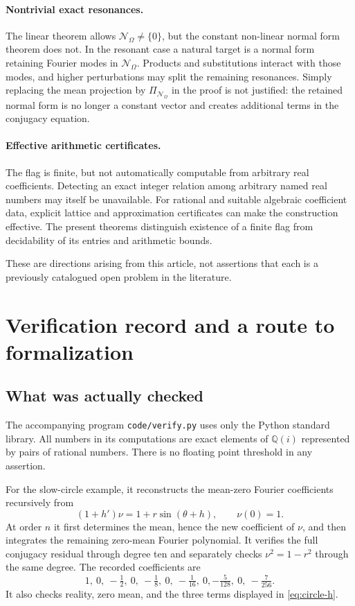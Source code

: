 \documentclass[11pt,letterpaper]{article}
\theoremstyle{definition}
\theoremstyle{remark}
\newcommand{\Q}{\mathbb Q}
\newcommand{\res}{\mathcal N_{\Omega}}
\numberwithin{equation}{section}
\begin{document}
\paragraph{Nontrivial exact resonances.}
The linear theorem allows $\res\ne\{0\}$, but the constant non-linear
normal form theorem does not.  In the resonant case a natural target is a
normal form retaining Fourier modes in $\res$.  Products and substitutions
interact with those modes, and higher perturbations may split the remaining
resonances.  Simply replacing the mean projection by $\Pi_{\res}$ in the
proof is not justified: the retained normal form is no longer a constant
vector and creates additional terms in the conjugacy equation.

\paragraph{Effective arithmetic certificates.}
The flag is finite, but not automatically computable from arbitrary real
coefficients.  Detecting an exact integer relation among arbitrary named
real numbers may itself be unavailable.  For rational and suitable
algebraic coefficient data, explicit lattice and approximation certificates
can make the construction effective.  The present theorems distinguish
existence of a finite flag from decidability of its entries and arithmetic
bounds.

These are directions arising from this article, not assertions that each
is a previously catalogued open problem in the literature.

\section{Verification record and a route to formalization}
\label{sec:verification}

\subsection{What was actually checked}

The accompanying program \texttt{code/verify.py} uses only the Python
standard library.  All numbers in its computations are exact elements of
$\Q(i)$ represented by pairs of rational numbers.  There is no floating
point threshold in any assertion.

For the slow-circle example, it reconstructs the mean-zero Fourier
coefficients recursively from
\[
 (1+h')\nu=1+r\sin(\theta+h),\qquad \nu(0)=1.
\]
At order $n$ it first determines the mean, hence the new coefficient of
$\nu$, and then integrates the remaining zero-mean Fourier polynomial.
It verifies the full conjugacy residual through degree ten and separately
checks $\nu^2=1-r^2$ through the same degree.  The recorded coefficients are
\[
 1,\ 0,\ -\tfrac12,\ 0,\ -\tfrac18,\ 0,\ -\tfrac1{16},\ 0,
 -\tfrac5{128},\ 0,\ -\tfrac7{256}.
\]
It also checks reality, zero mean, and the three terms displayed in
\eqref{eq:circle-h}.
\end{document}
